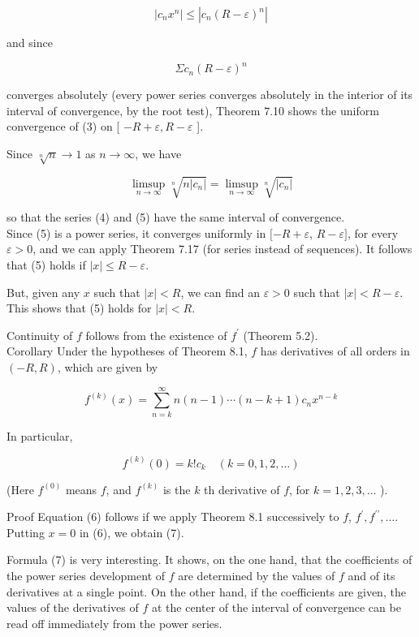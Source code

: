 \documentclass[10pt]{article}
\begin{document}
$$
\left|c_{n} x^{n}\right| \leq\left|c_{n}(R-\varepsilon)^{n}\right|
$$

and since

$$
\Sigma c_{n}(R-\varepsilon)^{n}
$$

converges absolutely (every power series converges absolutely in the interior of its interval of convergence, by the root test), Theorem 7.10 shows the uniform convergence of (3) on [ $-R+\varepsilon, R-\varepsilon$ ].

Since $\sqrt[n]{n} \rightarrow 1$ as $n \rightarrow \infty$, we have

$$
\limsup _{n \rightarrow \infty} \sqrt[n]{n\left|c_{n}\right|}=\limsup _{n \rightarrow \infty} \sqrt[n]{\left|c_{n}\right|}
$$

so that the series (4) and (5) have the same interval of convergence.\\
Since (5) is a power series, it converges uniformly in $[-R+\varepsilon$, $R-\varepsilon]$, for every $\varepsilon>0$, and we can apply Theorem 7.17 (for series instead of sequences). It follows that (5) holds if $|x| \leq R-\varepsilon$.

But, given any $x$ such that $|x|<R$, we can find an $\varepsilon>0$ such that $|x|<R-\varepsilon$. This shows that (5) holds for $|x|<R$.

Continuity of $f$ follows from the existence of $f^{\prime}$ (Theorem 5.2).\\
Corollary Under the hypotheses of Theorem 8.1, $f$ has derivatives of all orders in $(-R, R)$, which are given by


\begin{equation*}
f^{(k)}(x)=\sum_{n=k}^{\infty} n(n-1) \cdots(n-k+1) c_{n} x^{n-k} \tag{6}
\end{equation*}


In particular,


\begin{equation*}
f^{(k)}(0)=k!c_{k} \quad(k=0,1,2, \ldots) \tag{7}
\end{equation*}


(Here $f^{(0)}$ means $f$, and $f^{(k)}$ is the $k$ th derivative of $f$, for $k=1,2,3, \ldots$ ).

Proof Equation (6) follows if we apply Theorem 8.1 successively to $f$, $f^{\prime}, f^{\prime \prime}, \ldots$. Putting $x=0$ in (6), we obtain (7).

Formula (7) is very interesting. It shows, on the one hand, that the coefficients of the power series development of $f$ are determined by the values of $f$ and of its derivatives at a single point. On the other hand, if the coefficients are given, the values of the derivatives of $f$ at the center of the interval of convergence can be read off immediately from the power series.
\end{document}
